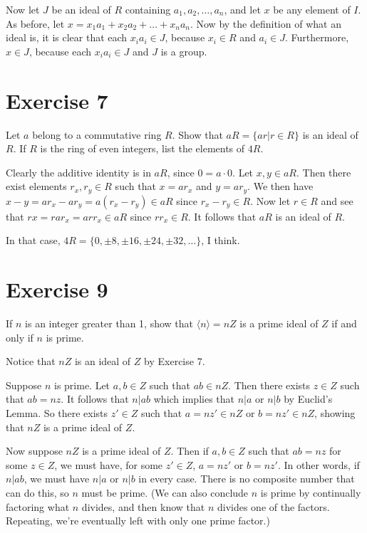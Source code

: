\documentclass[12pt]{article}
\begin{document}
Now let $J$ be an ideal of $R$ containing $a_1,a_2,\dots,a_n$,
and let $x$ be any element of $I$.  As before, let $x=x_1a_1+x_2a_2+\dots+x_na_n$.
Now by the definition of what an ideal is, it is clear that each $x_ia_i\in J$, because
$x_i\in R$ and $a_i\in J$.  Furthermore, $x\in J$, because each $x_ia_i\in J$ and $J$ is a group.

\section*{Exercise 7}

Let $a$ belong to a commutative ring $R$.  Show that $aR=\{ar|r\in R\}$
is an ideal of $R$.  If $R$ is the ring of even integers, list the elements of $4R$.

Clearly the additive identity is in $aR$, since $0=a\cdot 0$.
Let $x,y\in aR$.  Then there exist elements $r_x,r_y\in R$ such that $x=ar_x$ and $y=ar_y$.
We then have $x-y=ar_x-ar_y=a(r_x-r_y)\in aR$ since $r_x-r_y\in R$.
Now let $r\in R$ and see that $rx=rar_x=arr_x\in aR$ since $rr_x\in R$.
It follows that $aR$ is an ideal of $R$.

In that case, $4R=\{0, \pm 8, \pm 16, \pm 24, \pm 32, \dots\}$, I think.

\section*{Exercise 9}

If $n$ is an integer greater than 1, show that $\langle n\rangle=nZ$ is a prime ideal of $Z$
if and only if $n$ is prime.

Notice that $nZ$ is an ideal of $Z$ by Exercise 7.

Suppose $n$ is prime.  Let $a,b\in Z$ such that $ab\in nZ$.
Then there exists $z\in Z$ such that $ab=nz$.  It follows
that $n|ab$ which implies that $n|a$ or $n|b$ by Euclid's Lemma.
So there exists $z'\in Z$ such that $a=nz'\in nZ$ or $b=nz'\in nZ$,
showing that $nZ$ is a prime ideal of $Z$.

Now suppose $nZ$ is a prime ideal of $Z$.
Then if $a,b\in Z$ such that $ab=nz$ for some $z\in Z$,
we must have, for some $z'\in Z$, $a=nz'$ or $b=nz'$.
In other words, if $n|ab$, we must have $n|a$ or $n|b$
in every case.  There is no composite number that can do this,
so $n$ must be prime.  (We can also conclude $n$ is prime
by continually factoring what $n$ divides, and then know that $n$
divides one of the factors.  Repeating, we're eventually left with only one prime factor.)
\end{document}
